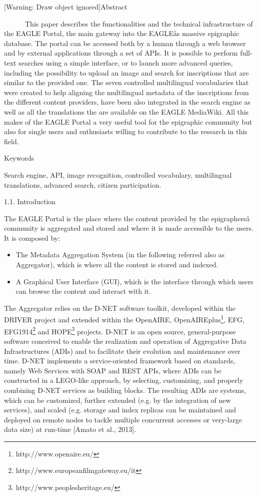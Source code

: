 \title{}
\author{claudio prandoni}
\date{2015-11-09}

[Warning: Draw object ignored]Abstract

\ \ \ \ \ \ This paper describes the functionalities and the technical infrastructure of the EAGLE Portal, the main
gateway into the EAGLEâs massive epigraphic database. The portal can be accessed both by a human through a web browser
and by external applications through a set of APIs. It is possible to perform full-text searches using a simple
interface, or to launch more advanced queries, including the possibility to upload an image and search for inscriptions
that are similar to the provided one. The seven controlled multilingual vocabularies that were created to help aligning
the multilingual metadata of the inscriptions from the different content providers, have been also integrated in the
search engine as well as all the translations the are available on the EAGLE MediaWiki. All this makes of the EAGLE
Portal a very useful tool for the epigraphic community but also for single users and enthusiasts willing to contribute
to the research in this field.

Keywords

Search engine, API, image recognition, controlled vocabulary, multilingual translations, advanced search, citizen
participation.

1.1. Introduction

The EAGLE Portal is the place where the content provided by the epigraphersâ community is aggregated and stored and
where it is made accessible to the users. It is composed by:

\begin{itemize}
\item The Metadata Aggregation System (in the following referred also as Aggregator), which is where all the content is
stored and indexed.
\item A Graphical User Interface (GUI), which is the interface through which users can browse the content and interact
with it.
\end{itemize}
The Aggregator relies on the D-NET software toolkit, developed within the DRIVER project and extended within the
OpenAIRE, OpenAIREplus\footnote{http://www.openaire.eu/}, EFG, EFG1914\footnote{http://www.europeanfilmgateway.eu/it}
and HOPE\footnote{http://www.peoplesheritage.eu/} projects. D-NET is an open source, general-purpose software conceived
to enable the realization and operation of Aggregative Data Infrastructures (ADIs) and to facilitate their evolution
and maintenance over time. D-NET implements a service-oriented framework based on standards, namely Web Services with
SOAP and REST APIs, where ADIs can be constructed in a LEGO-like approach, by selecting, customizing, and properly
combining D-NET services as building blocks. The resulting ADIs are systems, which can be customized, further extended
(e.g. by the integration of new services), and scaled (e.g. storage and index replicas can be maintained and deployed
on remote nodes to tackle multiple concurrent accesses or very-large data size) at run-time [Amato et al., 2013].

